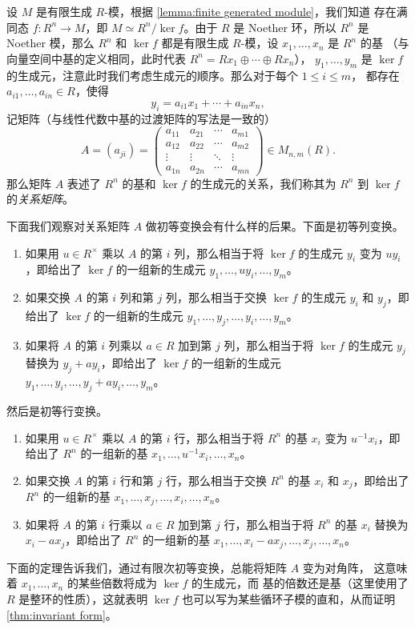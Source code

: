 \documentclass[fontset=none,zihao=-4]{Notes}
\begin{document}
设 $M$ 是有限生成 $R$-模，根据 \autoref{lemma:finite generated module}，我们知道
存在满同态 $f:R^n\to M$，即 $M\simeq R^n/\ker f$。由于
$R$ 是 Noether 环，所以 $R^n$ 是 Noether 模，那么 $R^n$
和 $\ker f$ 都是有限生成 $R$-模，设 $x_1,\dots,x_n$ 是 $R^n$ 的基
（与向量空间中基的定义相同，此时代表 $R^n=Rx_1\oplus\cdots\oplus Rx_n$），
$y_1,\dots,y_m$ 是 $\ker f$ 的生成元，注意此时我们考虑生成元的顺序。那么对于每个 $1\leq i\leq m$，
都存在 $a_{i1},\dots,a_{in}\in R$，使得
\[
  y_i=a_{i1}x_1+\cdots+a_{in}x_n  ,
\]
记矩阵（与线性代数中基的过渡矩阵的写法是一致的）
\[
  A=(a_{ji})=
  \begin{pmatrix}
    a_{11} & a_{21} & \cdots & a_{m1} \\
    a_{12} & a_{22} & \cdots & a_{m2} \\
    \vdots & \vdots & \ddots & \vdots \\
    a_{1n} & a_{2n} & \cdots & a_{mn}
  \end{pmatrix}  \in M_{n,m}(R).
\]
那么矩阵 $ A$ 表述了 $R^n$ 的基和 $\ker f$ 的生成元的关系，我们称其为
$R^n$ 到 $\ker f$ 的\emph{关系矩阵}。

下面我们观察对关系矩阵 $A$ 做初等变换会有什么样的后果。下面是初等列变换。
\begin{enumerate}
  \item 如果用 $u\in R^\times$ 乘以 $A$ 的第 $i$ 列，那么相当于将 $\ker f$ 的生成元
  $y_i$ 变为 $uy_i$，即给出了 $\ker f$ 的一组新的生成元
  $y_1,\dots,uy_i,\dots,y_m$。
  \item 如果交换 $A$ 的第 $i$ 列和第 $j$ 列，那么相当于交换 $\ker f$ 的生成元
  $y_i$ 和 $y_j$，即给出了 $\ker f$ 的一组新的生成元
  $y_1,\dots,y_j,\dots ,y_i,\dots,y_m$。
  \item 如果将 $A$ 的第 $i$ 列乘以 $a\in R$ 加到第 $j$ 列，那么相当于将 $\ker f$
  的生成元 $y_j$ 替换为 $y_j+ay_i$，即给出了 $\ker f$ 的一组新的生成元
  $y_1,\dots,y_i,\dots ,y_j+ay_i,\dots,y_m$。
\end{enumerate}
然后是初等行变换。
\begin{enumerate}
  \item 如果用 $u\in R^\times$ 乘以 $A$ 的第 $i$ 行，那么相当于将 $R^n$ 的基
  $x_i$ 变为 $u^{-1}x_i$，即给出了 $R^n$ 的一组新的基
  $x_1,\dots,u^{-1}x_i,\dots,x_n$。
  \item 如果交换 $A$ 的第 $i$ 行和第 $j$ 行，那么相当于交换 $R^n$ 的基
  $x_i$ 和 $x_j$，即给出了 $R^n$ 的一组新的基
  $x_1,\dots,x_j,\dots ,x_i,\dots,x_n$。
  \item 如果将 $A$ 的第 $i$ 行乘以 $a\in R$ 加到第 $j$ 行，那么相当于将 $R^n$
  的基 $x_i$ 替换为 $x_i-ax_j$，即给出了 $R^n$ 的一组新的基
  $x_1,\dots,x_i-ax_j,\dots ,x_j,\dots,x_n$。
\end{enumerate}
下面的定理告诉我们，通过有限次初等变换，总能将矩阵 $A$ 变为对角阵，
这意味着 $x_1,\dots,x_n$ 的某些倍数将成为 $\ker f$ 的生成元，而
基的倍数还是基（这里使用了 $R$ 是整环的性质），这就表明 
$\ker f$ 也可以写为某些循环子模的直和，从而证明
\autoref{thm:invariant form}。
\end{document}
